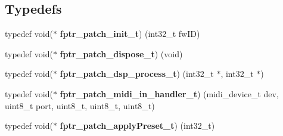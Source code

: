 \subsection*{Typedefs}
\begin{DoxyCompactItemize}
\item 
typedef void($\ast$ {\bfseries fptr\+\_\+patch\+\_\+init\+\_\+t}) (int32\+\_\+t fw\+ID)\hypertarget{group__PATCH_ga9d6a354b27e6d599d5d739856531039d}{}\label{group__PATCH_ga9d6a354b27e6d599d5d739856531039d}

\item 
typedef void($\ast$ {\bfseries fptr\+\_\+patch\+\_\+dispose\+\_\+t}) (void)\hypertarget{group__PATCH_ga78253d4c6e83398525ffc139e1121591}{}\label{group__PATCH_ga78253d4c6e83398525ffc139e1121591}

\item 
typedef void($\ast$ {\bfseries fptr\+\_\+patch\+\_\+dsp\+\_\+process\+\_\+t}) (int32\+\_\+t $\ast$, int32\+\_\+t $\ast$)\hypertarget{group__PATCH_ga659c80dccffac8ebdb2f13072cfcc520}{}\label{group__PATCH_ga659c80dccffac8ebdb2f13072cfcc520}

\item 
typedef void($\ast$ {\bfseries fptr\+\_\+patch\+\_\+midi\+\_\+in\+\_\+handler\+\_\+t}) (midi\+\_\+device\+\_\+t dev, uint8\+\_\+t port, uint8\+\_\+t, uint8\+\_\+t, uint8\+\_\+t)\hypertarget{group__PATCH_ga8effe12cff4877b93c1013ec57bd2291}{}\label{group__PATCH_ga8effe12cff4877b93c1013ec57bd2291}

\item 
typedef void($\ast$ {\bfseries fptr\+\_\+patch\+\_\+apply\+Preset\+\_\+t}) (int32\+\_\+t)\hypertarget{group__PATCH_ga7ccdf2400ad66e1f6d93cf6c8577dd21}{}\label{group__PATCH_ga7ccdf2400ad66e1f6d93cf6c8577dd21}

\end{DoxyCompactItemize}

